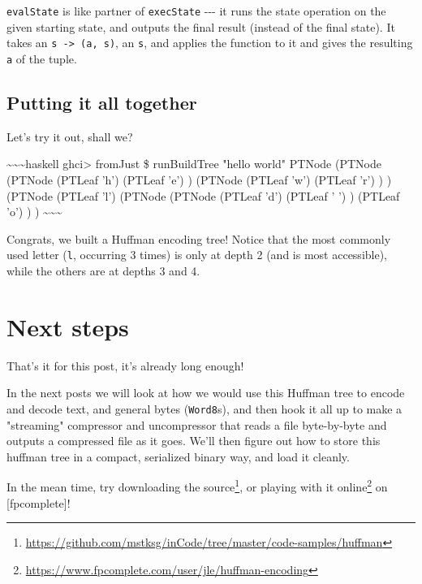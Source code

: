 \documentclass[]{article}
\renewcommand{\href}[2]{#2\footnote{\url{#1}}}
\begin{document}
\texttt{evalState} is like partner of \texttt{execState} -\/-\/- it runs the
state operation on the given starting state, and outputs the final result
(instead of the final state). It takes an \texttt{s\ -\textgreater{}\ (a,\ s)},
an \texttt{s}, and applies the function to it and gives the resulting \texttt{a}
of the tuple.

\subsection{Putting it all together}

Let's try it out, shall we?

\textasciitilde{}\textasciitilde{}\textasciitilde{}haskell ghci\textgreater{}
fromJust \$ runBuildTree "hello world" PTNode (PTNode (PTNode (PTLeaf 'h')
(PTLeaf 'e') ) (PTNode (PTLeaf 'w') (PTLeaf 'r') ) ) (PTNode (PTLeaf 'l')
(PTNode (PTNode (PTLeaf 'd') (PTLeaf ' ') ) (PTLeaf 'o') ) )
\textasciitilde{}\textasciitilde{}\textasciitilde{}

Congrats, we built a Huffman encoding tree! Notice that the most commonly used
letter (\texttt{\textquotesingle{}l\textquotesingle{}}, occurring 3 times) is
only at depth 2 (and is most accessible), while the others are at depths 3 and
4.

\section{Next steps}

That's it for this post, it's already long enough!

In the next posts we will look at how we would use this Huffman tree to encode
and decode text, and general bytes (\texttt{Word8}s), and then hook it all up to
make a "streaming" compressor and uncompressor that reads a file byte-by-byte
and outputs a compressed file as it goes. We'll then figure out how to store
this huffman tree in a compact, serialized binary way, and load it cleanly.

In the mean time, try
\href{https://github.com/mstksg/inCode/tree/master/code-samples/huffman}{downloading
the source}, or
\href{https://www.fpcomplete.com/user/jle/huffman-encoding}{playing with it
online} on {[}fpcomplete{]}!
\end{document}
